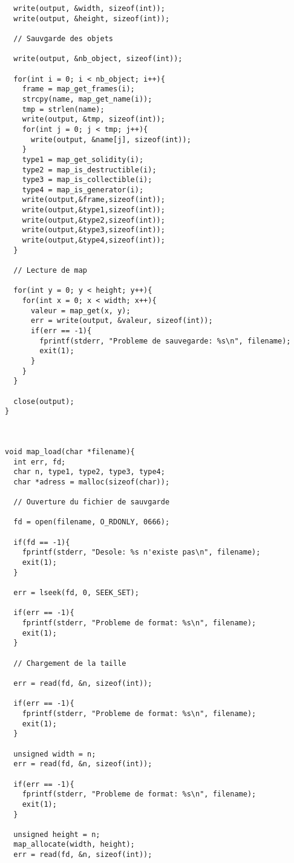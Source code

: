 \documentclass{report}
\begin{document}
\begin{lstlisting}
  write(output, &width, sizeof(int));
  write(output, &height, sizeof(int));
  
  // Sauvgarde des objets
  
  write(output, &nb_object, sizeof(int));
  
  for(int i = 0; i < nb_object; i++){
    frame = map_get_frames(i);
    strcpy(name, map_get_name(i));
    tmp = strlen(name);
    write(output, &tmp, sizeof(int));
    for(int j = 0; j < tmp; j++){
      write(output, &name[j], sizeof(int));
    }
    type1 = map_get_solidity(i);
    type2 = map_is_destructible(i);
    type3 = map_is_collectible(i);
    type4 = map_is_generator(i);
    write(output,&frame,sizeof(int));
    write(output,&type1,sizeof(int));
    write(output,&type2,sizeof(int));
    write(output,&type3,sizeof(int));
    write(output,&type4,sizeof(int));
  }
  
  // Lecture de map
  
  for(int y = 0; y < height; y++){
    for(int x = 0; x < width; x++){
      valeur = map_get(x, y);
      err = write(output, &valeur, sizeof(int));
      if(err == -1){
	    fprintf(stderr, "Probleme de sauvegarde: %s\n", filename);
	    exit(1);
      }
    }
  }
  
  close(output);
}



void map_load(char *filename){
  int err, fd;
  char n, type1, type2, type3, type4;
  char *adress = malloc(sizeof(char));
  
  // Ouverture du fichier de sauvgarde
  
  fd = open(filename, O_RDONLY, 0666);
  
  if(fd == -1){
    fprintf(stderr, "Desole: %s n'existe pas\n", filename);
    exit(1);
  }
  
  err = lseek(fd, 0, SEEK_SET);

  if(err == -1){
    fprintf(stderr, "Probleme de format: %s\n", filename);
    exit(1);
  }
  
  // Chargement de la taille
  
  err = read(fd, &n, sizeof(int));
  
  if(err == -1){
    fprintf(stderr, "Probleme de format: %s\n", filename);
    exit(1);
  }
  
  unsigned width = n;
  err = read(fd, &n, sizeof(int));
  
  if(err == -1){
    fprintf(stderr, "Probleme de format: %s\n", filename);
    exit(1);
  }
  
  unsigned height = n;
  map_allocate(width, height);
  err = read(fd, &n, sizeof(int));
  

\end{lstlisting}
\end{document}
